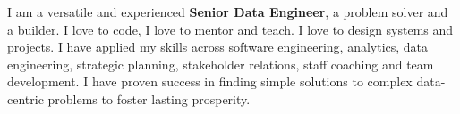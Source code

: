 
\begin{cvsummary}
  \summary
    {I am a versatile and experienced \textbf{Senior Data Engineer}, a problem solver and a builder. I love to code, I love to mentor and teach. I love to design systems and projects. I have applied my skills across software engineering, analytics, data engineering, strategic planning, stakeholder relations, staff coaching and team development. I have proven success in finding simple solutions to complex data-centric problems to foster lasting prosperity.}
\end{cvsummary}
